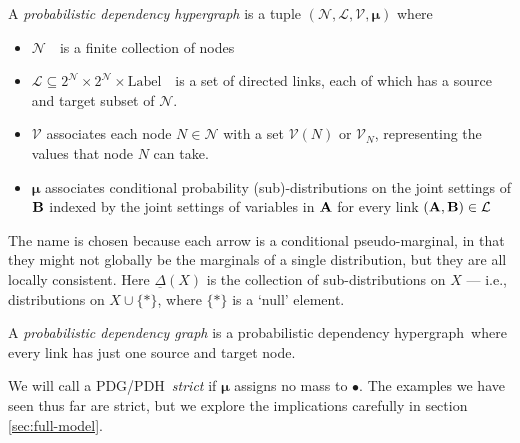 \documentclass{article}
\newcommand\changeoff{\color{black} }
\newcommand\bmu{\boldsymbol{\mu}}
\newcommand{\V}{\mathcal V}
\newcommand{\N}{\mathcal N}
\newcommand{\Li}{\mathcal L}
\newcommand{\modelname}{probabilistic dependency graph}
\newcommand{\modelnamehyper}{probabilistic dependency hypergraph}
\newcommand{\MN}{PDG}
\newcommand{\MNH}{PDH}
\begin{document}
	
	\def\mnvars[#1]{(\mathcal N#1, \mathcal L#1, \mathcal V#1, \bmu#1)}
	\begin{defn}[\MNH]\label{def:hypermodel}
		A \emph{\modelnamehyper} is a tuple $\mnvars[]$ where
		\begin{itemize}[nosep]
			\item $\N$~~is a finite collection of nodes
			\item $\Li \subseteq 2^{\N} \times 2^{\N} \times \mathrm{Label}$~~is a set of directed links, each of which has a source and target subset of $\N$.
			\item $\V$ associates each node $N \in \mathcal N$ with a set $\V(N)$ or $\V_N$, representing the values that node $N$ can take.
			\item $\bmu$
			associates conditional probability (sub)-distributions on the joint settings of $\bf B$ indexed by the joint settings of variables in $\bf A$ for every link $({\bf A,B}) \in \mathcal L$ %
		\end{itemize}

	\end{defn}

	The name is chosen because each arrow is a conditional pseudo-marginal, in that they might not
	globally be the marginals of a single distribution, but they are all locally consistent. 
	Here $\underline\Delta(X)$ is the collection of sub-distributions on $X$ --- i.e., distributions on $X \cup \{*\}$, where $\{*\}$ is a `null' element. 

	\begin{defn}[\MN]\label{def:model}
		A \textit{\modelname} is a \modelnamehyper\ where every link has just one source and target node.
	\end{defn}

	We will call a \MN/\MNH\ \emph{strict} if $\bmu$ assigns no mass to $\bullet$. The examples we have seen thus far are strict, but we explore the implications carefully in section \ref{sec:full-model}.

	
	




	\changeoff
\end{document}
